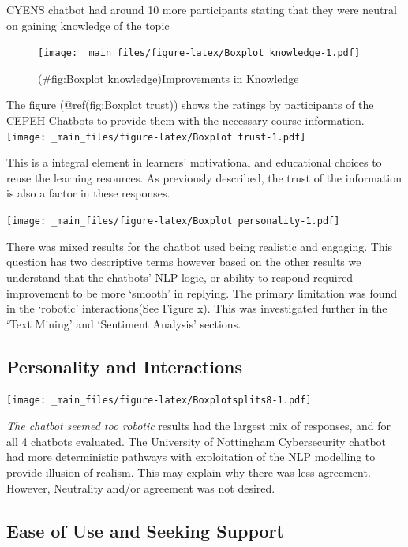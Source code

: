 \documentclass[a4paper, nobind]{templates/ociamthesis}
\begin{document}
CYENS chatbot had around 10 more participants stating that they were neutral on gaining knowledge of the topic

\begin{figure}
\centering
\texttt{[image: \_main\_files/figure-latex/Boxplot knowledge-1.pdf]}
\caption{(\#fig:Boxplot knowledge)Improvements in Knowledge}
\end{figure}

The figure (@ref(fig:Boxplot trust)) shows the ratings by participants of the CEPEH Chatbots to provide them with the necessary course information.
\texttt{[image: \_main\_files/figure-latex/Boxplot trust-1.pdf]}

This is a integral element in learners' motivational and educational choices to reuse the learning resources. As previously described, the trust of the information is also a factor in these responses.

\texttt{[image: \_main\_files/figure-latex/Boxplot personality-1.pdf]}

There was mixed results for the chatbot used being realistic and engaging. This question has two descriptive terms however based on the other results we understand that the chatbots' NLP logic, or ability to respond required improvement to be more `smooth' in replying. The
primary limitation was found in the `robotic' interactions(See Figure x). This was investigated further in the `Text Mining' and `Sentiment Analysis' sections.

\hypertarget{personality-and-interactions}{%
\subsection{Personality and Interactions}\label{personality-and-interactions}}

\texttt{[image: \_main\_files/figure-latex/Boxplotsplits8-1.pdf]}

\emph{The chatbot seemed too robotic} results had the largest mix of
responses, and for all 4 chatbots evaluated. The University of
Nottingham Cybersecurity chatbot had more deterministic pathways with
exploitation of the NLP modelling to provide illusion of realism. This
may explain why there was less agreement. However, Neutrality and/or
agreement was not desired.

\hypertarget{ease-of-use-and-seeking-support}{%
\subsection{Ease of Use and Seeking Support}\label{ease-of-use-and-seeking-support}}
\end{document}

